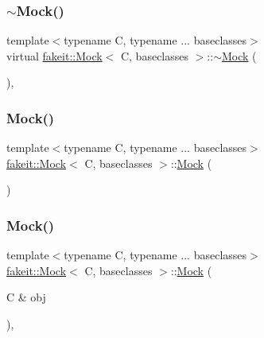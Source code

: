 \subsubsection{\texorpdfstring{$\sim$Mock()}{~Mock()}\hspace{0.1cm}{\footnotesize\ttfamily [7/9]}}
{\footnotesize\ttfamily template$<$typename C, typename ... baseclasses$>$ \\
virtual \mbox{\hyperlink{classfakeit_1_1Mock}{fakeit\+::\+Mock}}$<$ C, baseclasses $>$\+::$\sim$\mbox{\hyperlink{classfakeit_1_1Mock}{Mock}} (\begin{DoxyParamCaption}{ }\end{DoxyParamCaption})\hspace{0.3cm}{\ttfamily [virtual]}, {\ttfamily [default]}}

\mbox{\label{classfakeit_1_1Mock_af7a86c609a2ee704ee09de6db066c7f4}} 
\subsubsection{\texorpdfstring{Mock()}{Mock()}\hspace{0.1cm}{\footnotesize\ttfamily [13/18]}}
{\footnotesize\ttfamily template$<$typename C, typename ... baseclasses$>$ \\
\mbox{\hyperlink{classfakeit_1_1Mock}{fakeit\+::\+Mock}}$<$ C, baseclasses $>$\+::\mbox{\hyperlink{classfakeit_1_1Mock}{Mock}} (\begin{DoxyParamCaption}{ }\end{DoxyParamCaption})\hspace{0.3cm}{\ttfamily [inline]}}

\mbox{\label{classfakeit_1_1Mock_aa474a0d6c7447608253a0fc306eb6ef5}} 
\subsubsection{\texorpdfstring{Mock()}{Mock()}\hspace{0.1cm}{\footnotesize\ttfamily [14/18]}}
{\footnotesize\ttfamily template$<$typename C, typename ... baseclasses$>$ \\
\mbox{\hyperlink{classfakeit_1_1Mock}{fakeit\+::\+Mock}}$<$ C, baseclasses $>$\+::\mbox{\hyperlink{classfakeit_1_1Mock}{Mock}} (\begin{DoxyParamCaption}\item[{C \&}]{obj }\end{DoxyParamCaption})\hspace{0.3cm}{\ttfamily [inline]}, {\ttfamily [explicit]}}

